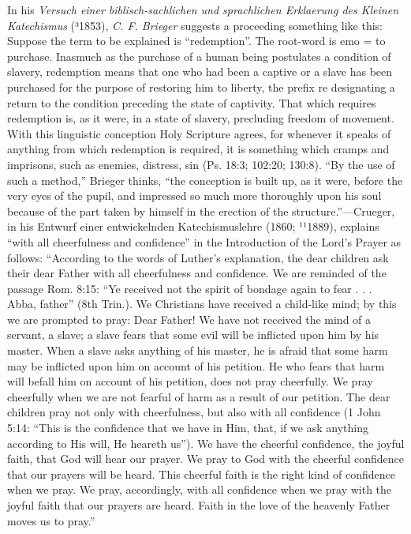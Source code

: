 In his \emph{Versuch einer biblisch-sachlichen und sprachlichen Erklaerung des Kleinen Katechismus} (³1853), \emph{C. F. Brieger} suggests a proceeding something like this: Suppose the term to be explained is “redemption”. The root-word is emo = to purchase. Inasmuch as the purchase of a human being postulates a condition of slavery, redemption means that one who had been a captive or a slave has been purchased for the purpose of restoring him to liberty, the prefix re designating a return to the condition preceding the state of captivity. That which requires redemption is, as it were, in a state of slavery, precluding freedom of movement. With this linguistic conception Holy Scripture agrees, for whenever it speaks of anything from which redemption is required, it is something which cramps and imprisons, such as enemies, distress, sin (Ps. 18:3; 102:20; 130:8). “By the use of such a method,” Brieger thinks, “the conception is built up, as it were, before the very eyes of the pupil, and impressed so much more thoroughly upon his soul because of the part taken by himself in the erection of the structure.”—Crueger, in his Entwurf einer entwickelnden Katechismuslehre (1860; ¹¹1889), explains “with
all cheerfulness and confidence” in the Introduction of the Lord’s Prayer as follows: “According to the words of Luther’s explanation, the dear children ask their dear Father with all cheerfulness and confidence. We are reminded of the passage Rom. 8:15: “Ye received not the spirit of bondage again to fear . . . Abba, father” (8th Trin.). We Christians have received a child-like mind; by this we are prompted to pray: Dear Father! We have not received the mind of a servant, a slave; a slave fears that some evil will be inflicted upon him by his master. When a slave asks anything of his master, he is afraid that some harm may be inflicted upon him on account of his petition. He who fears that harm will befall him on account of his petition, does not pray cheerfully. We pray cheerfully when we are not fearful of harm as a result of our petition. The dear children pray not only with cheerfulness, but also with all confidence (1 John 5:14: “This is the confidence that we have in Him, that, if we ask anything according to His will, He heareth us”). We have the cheerful confidence, the joyful faith, that God will hear our prayer. We pray to God with the cheerful confidence that our prayers will be heard. This cheerful faith is the right kind of confidence when we pray. We pray, accordingly, with all confidence when we pray with the joyful faith that our prayers are heard. Faith in the love of the heavenly Father moves us to pray.”

